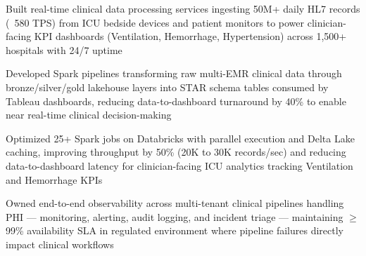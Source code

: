 \begin{highlights}
    \item Built real-time clinical data processing services ingesting 50M+ daily HL7 records (~580 TPS) from ICU bedside devices and patient monitors to power clinician-facing KPI dashboards (Ventilation, Hemorrhage, Hypertension) across 1,500+ hospitals with 24/7 uptime
    \item Developed Spark pipelines transforming raw multi-EMR clinical data through bronze/silver/gold lakehouse layers into STAR schema tables consumed by Tableau dashboards, reducing data-to-dashboard turnaround by 40\% to enable near real-time clinical decision-making
    \item Optimized 25+ Spark jobs on Databricks with parallel execution and Delta Lake caching, improving throughput by 50\% (20K to 30K records/sec) and reducing data-to-dashboard latency for clinician-facing ICU analytics tracking Ventilation and Hemorrhage KPIs
    \item Owned end-to-end observability across multi-tenant clinical pipelines handling PHI — monitoring, alerting, audit logging, and incident triage — maintaining $\geq$99\% availability SLA in regulated environment where pipeline failures directly impact clinical workflows
\end{highlights}
